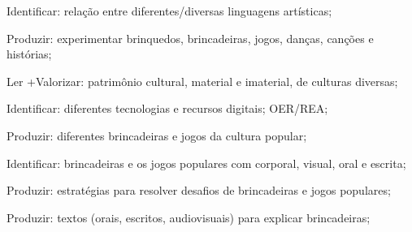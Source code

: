  Identificar: relação entre diferentes/diversas linguagens artísticas;

 Produzir: experimentar brinquedos, brincadeiras, jogos, danças, canções e histórias;

 Ler +Valorizar: patrimônio cultural, material e imaterial, de culturas diversas; 

 Identificar: diferentes tecnologias e recursos digitais; OER/REA;

 Produzir: diferentes brincadeiras e jogos da cultura popular;

 Identificar: brincadeiras e os jogos populares com corporal, visual, oral e escrita;

 Produzir: estratégias para resolver desafios de brincadeiras e jogos populares;

 Produzir: textos (orais, escritos, audiovisuais) para explicar brincadeiras;


